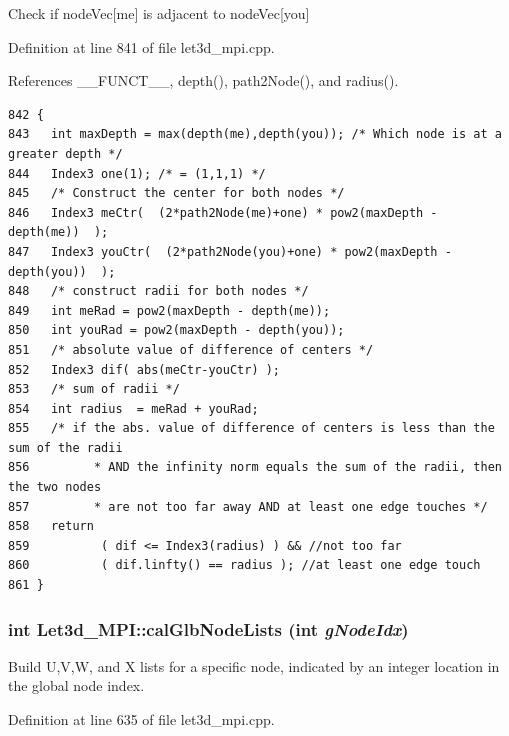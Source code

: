 Check if node\-Vec[me] is adjacent to node\-Vec[you] 

Definition at line 841 of file let3d\_\-mpi.cpp.

References \_\-\_\-FUNCT\_\-\_\-, depth(), path2Node(), and radius().

\footnotesize\begin{verbatim}842 {
843   int maxDepth = max(depth(me),depth(you)); /* Which node is at a greater depth */
844   Index3 one(1); /* = (1,1,1) */
845   /* Construct the center for both nodes */
846   Index3 meCtr(  (2*path2Node(me)+one) * pow2(maxDepth - depth(me))  );
847   Index3 youCtr(  (2*path2Node(you)+one) * pow2(maxDepth - depth(you))  );
848   /* construct radii for both nodes */
849   int meRad = pow2(maxDepth - depth(me));
850   int youRad = pow2(maxDepth - depth(you));
851   /* absolute value of difference of centers */
852   Index3 dif( abs(meCtr-youCtr) );
853   /* sum of radii */
854   int radius  = meRad + youRad;
855   /* if the abs. value of difference of centers is less than the sum of the radii
856         * AND the infinity norm equals the sum of the radii, then the two nodes
857         * are not too far away AND at least one edge touches */
858   return
859          ( dif <= Index3(radius) ) && //not too far
860          ( dif.linfty() == radius ); //at least one edge touch
861 }
\end{verbatim}\normalsize 


\subsubsection{\setlength{\rightskip}{0pt plus 5cm}int Let3d\_\-MPI::cal\-Glb\-Node\-Lists (int {\em g\-Node\-Idx})}\label{classLet3d__MPI_d1ba4ee8bb99cce06a89eb96cb9ddf8c_d1ba4ee8bb99cce06a89eb96cb9ddf8c}


Build U,V,W, and X lists for a specific node, indicated by an integer location in the global node index. 

Definition at line 635 of file let3d\_\-mpi.cpp.

